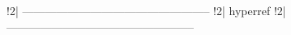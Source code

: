 !2| --------------------------------------------------
!2| {hyperref}
!2| --------------------------------------------------

\usepackage{hyperref}
